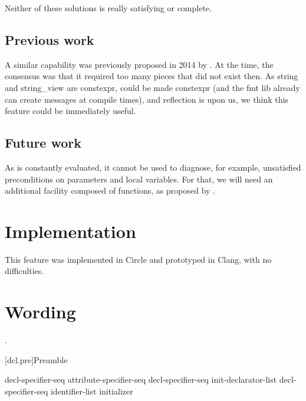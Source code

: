 \documentclass{wg21}
\begin{document}
Neither of these solutions is really satisfying or complete.

\subsection{Previous work}

A similar capability was previously proposed in 2014 by .
At the time, the consensus was that it required too many pieces that did not exist then.
As string and string_view are constexpr,  could be made constexpr (and the fmt lib already can create messages at compile times), and reflection is upon us,
we think this feature could be immediately useful.

\subsection{Future work}

As  is constantly evaluated, it cannot be used to diagnose, for example, unsatisfied preconditions on parameters and local variables.
For that, we will need an additional facility composed of  functions, as proposed by .

\section{Implementation}

This feature was implemented in Circle and prototyped in Clang, with no difficulties.

\section{Wording}

.



[dcl.pre]{Preamble}

\begin{bnf}
    \br
    decl-specifier-seq  \terminal{;}\br
    attribute-specifier-seq decl-specifier-seq init-declarator-list \terminal{;}\br
     decl-specifier-seq  \terminal{[} identifier-list \terminal{]} initializer \terminal{;}
\end{bnf}
\end{document}
